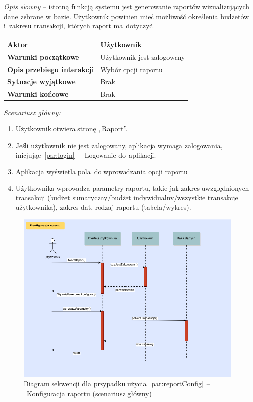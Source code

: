 \textit{Opis słowny} -- istotną funkcją systemu jest generowanie raportów wizualizujących dane zebrane w~bazie. Użytkownik powinien mieć możliwość określenia budżetów i~zakresu transakcji, których raport ma~dotyczyć.

\begin{longtable}{|p{5cm}|p{7cm}|}
  \hline \textbf{Aktor} & Użytkownik \\
  \hline \textbf{Warunki początkowe} & Użytkownik jest zalogowany \\
  \hline \textbf{Opis przebiegu interakcji} & Wybór opcji raportu \\
  \hline \textbf{Sytuacje wyjątkowe} & Brak \\
  \hline \textbf{Warunki końcowe} & Brak \\
  \hline
\end{longtable}

\noindent \textit{Scenariusz główny:}
\begin{enumerate}
  \item Użytkownik otwiera stronę ,,Raport''.
  \item Jeśli użytkownik nie jest zalogowany, aplikacja wymaga zalogowania, inicjując~\ref{par:login}~--~Logowanie do~aplikacji.
  \item Aplikacja wyświetla pola~do wprowadzania opcji raportu
  \item Użytkownika wprowadza parametry raportu, takie jak zakres uwzględnionych transakcji (budżet sumaryczny/budżet indywidualny/wszystkie transakcje użytkownika), zakres dat, rodzaj raportu (tabela/wykres).
\end{enumerate}

\begin{figure}[H]
  \includegraphics[width=\textwidth]{images/raport_konfig.png}
  \caption{Diagram sekwencji dla przypadku użycia~\ref{par:reportConfig}~--~Konfiguracja raportu (scenariusz główny)}
\end{figure}

